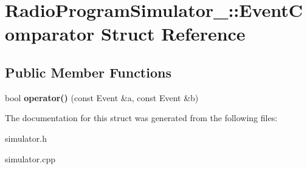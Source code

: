 \hypertarget{struct_radio_program_simulator___1_1_event_comparator}{}\section{Radio\+Program\+Simulator\+\_\+\+:\+:Event\+Comparator Struct Reference}
\label{struct_radio_program_simulator___1_1_event_comparator}
\subsection*{Public Member Functions}
\begin{DoxyCompactItemize}
\item 
bool {\bfseries operator()} (const Event \&a, const Event \&b)\hypertarget{struct_radio_program_simulator___1_1_event_comparator_a9a82a5f55ef975881ed775bbba70eeef}{}\label{struct_radio_program_simulator___1_1_event_comparator_a9a82a5f55ef975881ed775bbba70eeef}

\end{DoxyCompactItemize}


The documentation for this struct was generated from the following files\+:\begin{DoxyCompactItemize}
\item 
simulator.\+h\item 
simulator.\+cpp\end{DoxyCompactItemize}
